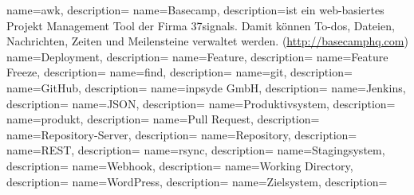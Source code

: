  {
  name=awk,
  description={}
}
 {
  name=Basecamp,
  description={ist ein web-basiertes Projekt Management Tool der Firma 37signals. Damit können To-dos, Dateien, Nachrichten, Zeiten und Meilensteine verwaltet werden. (\url{http://basecamphq.com})}
}
 {
  name=Deployment,
  description={}
}
 {
  name=Feature,
  description={}
}
 {
  name=Feature Freeze,
  description={}
}
 {
  name=find,
  description={}
}
 {
  name=git,
  description={}
}
 {
  name=GitHub,
  description={}
}
 {
  name=inpsyde GmbH,
  description={}
}
 {
  name=Jenkins,
  description={}
}
 {
  name=JSON,
  description={}
}
 {
  name=Produktivsystem,
  description={}
}
 {
  name=produkt,
  description={}
}
 {
  name=Pull Request,
  description={}
}
 {
  name=Repository-Server,
  description={}
}
 {
  name=Repository,
  description={}
}
 {
  name=REST,
  description={}
}
 {
  name=rsync,
  description={}
}
 {
  name=Stagingsystem,
  description={}
}
 {
  name=Webhook,
  description={}
}
 {
  name=Working Directory,
  description={}
}
 {
  name=WordPress,
  description={}
}
 {
  name=Zielsystem,
  description={}
}


\makeglossaries